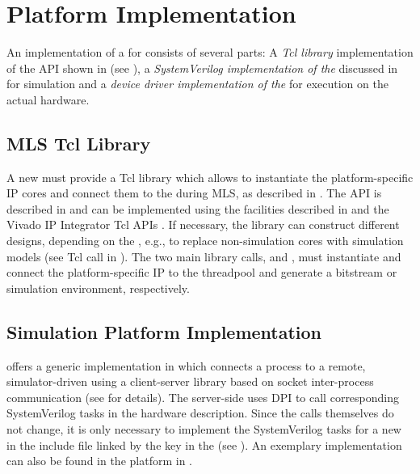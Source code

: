 \section{Platform Implementation}\label{sec:platform-implementation}%
An implementation of a  for \tapasco{} consists of several parts:
A \emph{Tcl library} implementation of the API shown in  (see ), a \emph{SystemVerilog implementation of the } discussed in  for simulation and a \emph{device driver implementation of the } for execution on the actual hardware.
%
\subsection{MLS Tcl Library}\label{sec:mls-papi}%
A new  must provide a Tcl library which allows to instantiate the platform-specific IP cores and connect them to the  during MLS, as described in .
The API is described in  and can be implemented using the facilities described in  and the Vivado IP Integrator Tcl APIs \cite{ug835}.
If necessary, the library can construct different designs, depending on the , e.g., to replace non-simulation cores with simulation models (see  Tcl call in ).
The two main library calls,  and , must instantiate and connect the platform-specific IP to the threadpool and generate a bitstream or simulation environment, respectively.

\subsection{Simulation Platform Implementation}\label{sec:pi-sim}%
\tapasco{} offers a generic  implementation in  which connects a process to a remote, simulator-driven  using a client-server library based on socket inter-process communication (see  for details).
The server-side uses DPI to call corresponding SystemVerilog tasks in the hardware description.
Since the  calls themselves do not change, it is only necessary to implement the SystemVerilog tasks for a new  in the include file linked by the  key in the  (see ).
An exemplary implementation can also be found in the  platform in .

